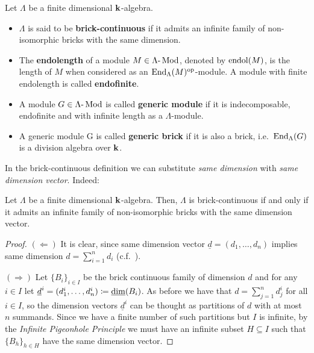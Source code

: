 \begin{definition}
	Let $\Lambda$ be a finite dimensional $\mathbf{k}$-algebra.
	\begin{itemize}
		\item $\Lambda$ is said to be \textbf{brick-continuous} if it admits an infinite family of non-isomorphic bricks with the same dimension.
		\item The \textbf{endolength} of a module $M\in \Lambda\text{-}\operatorname{Mod}$, denoted by $\operatorname{endol}(M)$, is the length of $M$ when considered as an $\operatorname{End}_\Lambda(M)^{\mathrm{op}}$-module. A module with finite endolength is called \textbf{endofinite}.
		\item A module $G\in \Lambda\text{-}\operatorname{Mod}$ is called \textbf{generic module}	if it is indecomposable, endofinite and with infinite length as a $\Lambda$-module.
		\item A generic module G is called \textbf{generic brick} if it is also a brick, i.e.~$\operatorname{End}_\Lambda(G)$ is a division algebra over $\mathbf{k}$.
	\end{itemize}
\end{definition}

In the brick-continuous definition we can substitute \emph{same dimension} with \emph{same dimension vector}. Indeed:
\begin{lemma}\label{lemma:brickcontdef}
	Let $\Lambda$ be a finite dimensional $\mathbf{k}$-algebra. Then, $\Lambda$ is brick-continuous if and only if it admits an infinite family of non-isomorphic bricks with the same dimension vector.
\end{lemma}
\begin{proof}
	$(\Leftarrow)$ It is clear, since same dimension vector $\underline{d}=(d_1,\dots,d_n)$ implies same dimension $d=\sum_{i=1}^{n} d_i$ (c.f.~\cite[Ch.III, Corollary 3.6]{sim:vol1}).
	
	$(\Rightarrow)$ Let $\{B_i\}_{i\in I}$ be the brick continuous family of dimension $d$ and for any $i\in I$ let $\underline{d}^i=(d^i_1,\dots,d^i_n)\coloneqq \underline{\dim}(B_i)$. As before we have that $d=\sum_{j=1}^{n} d^i_j$  for all $i\in I$, so the dimension vectors $\underline{d}^i$ can be thought as partitions of $d$ with at most $n$ summands. Since we have a finite number of such partitions but $I$ is infinite, by the \emph{Infinite Pigeonhole Principle} we must have an infinite subset $H\subseteq I$ such that $\{B_h\}_{h\in H}$ have the same dimension vector.
\end{proof}

